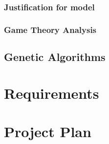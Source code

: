 \documentclass{article}
\begin{document}
\subsubsection{Justification for model}
\label{sec:justification-model}

\subsubsection{Game Theory Analysis}
\label{sec:game-theory}

\subsection{Genetic Algorithms}
\label{sec:genetic-algorithms}

\section{Requirements}
\label{sec:requirements}

\section{Project Plan}
\label{sec:project-plan}
\end{document}
